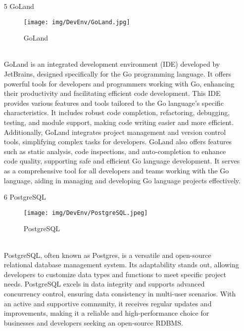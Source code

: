\documentclass[conference]{IEEEtran}
\begin{document}
\begin{enumerate}
\item[5] GoLand
\begin{figure}[h]
\centering
\texttt{[image: img/DevEnv/GoLand.jpg]}
\caption{GoLand} 
\end{figure}\\
GoLand is an integrated development environment (IDE) developed by JetBrains, designed specifically for the Go programming language. It offers powerful tools for developers and programmers working with Go, enhancing their productivity and facilitating efficient code development.
This IDE provides various features and tools tailored to the Go language's specific characteristics. It includes robust code completion, refactoring, debugging, testing, and module support, making code writing easier and more efficient. Additionally, GoLand integrates project management and version control tools, simplifying complex tasks for developers.
GoLand also offers features such as static analysis, code inspections, and auto-completion to enhance code quality, supporting safe and efficient Go language development. It serves as a comprehensive tool for all developers and teams working with the Go language, aiding in managing and developing Go language projects effectively.\\

\item[6] PostgreSQL
\begin{figure}[h]
\centering
\texttt{[image: img/DevEnv/PostgreSQL.jpeg]}
\caption{PostgreSQL} 
\end{figure}\\
PostgreSQL, often known as Postgres, is a versatile and open-source relational database management system. Its adaptability stands out, allowing developers to customize data types and functions to meet specific project needs. PostgreSQL excels in data integrity and supports advanced concurrency control, ensuring data consistency in multi-user scenarios. With an active and supportive community, it receives regular updates and improvements, making it a reliable and high-performance choice for businesses and developers seeking an open-source RDBMS.\\


\end{enumerate}
\end{document}
